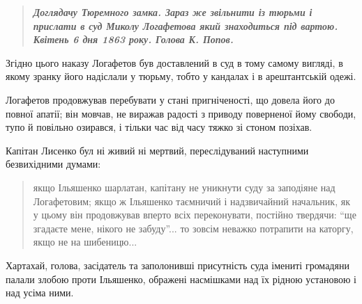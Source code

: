 \documentclass[a4paper,20pt]{report}
\begin{document}
\begin{quote}
\em\bfseries
Доглядачу Тюремного замка. Зараз же звільнити із тюрьми і прислати в суд Миколу
Логафетова який знаходиться під вартою. Квітень 6 дня 1863 року. Голова
К. Попов.
\end{quote}

Згідно цього наказу Логафетов був доставлений в суд в тому самому вигляді,
в якому зранку його надіслали у тюрьму, тобто у кандалах і в арештантській одежі.

Логафетов продовжував перебувати у стані пригніченості, що довела його до повної апатії;
він мовчав, не виражав радості з приводу поверненої йому свободи, тупо й повільно озирався, і тільки
час від часу тяжко зі стоном позіхав.



Капітан Лисенко бул ні живий ні мертвий, переслідуваний наступними безвихідними думами: 

\begin{quote}
\em\bfseries

якщо Ільяшенко шарлатан, капітану не уникнути суду за заподіяне над
Логафетовим; якщо ж Ільяшенко таємничий і надзвичайний начальник, як у цьому
він продовжував вперто всіх переконувати, постійно твердячи: ``ще згадаєте мене,
нікого не забуду''... то зовсім неважко потрапити на каторгу, якщо не на
шибеницю...
	

\end{quote}

Хартахай, голова, засідатель та заполонивші присутність суда імениті громадяни
палали злобою проти Ільяшенко, ображені насмішками над їх рідною установою і
над усіма ними.
\end{document}
